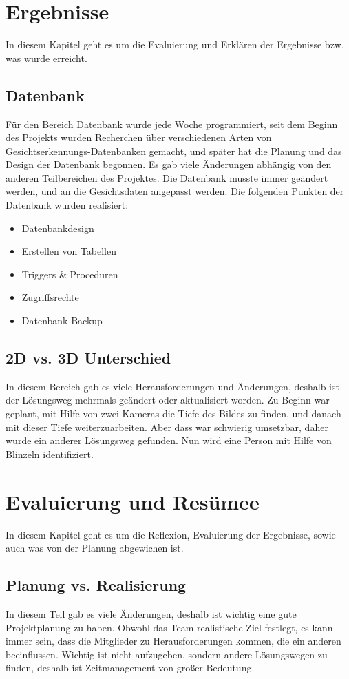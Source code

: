 \newpage
\section{Ergebnisse}
In diesem Kapitel geht es um die Evaluierung und Erklären der Ergebnisse bzw. was wurde erreicht.
\subsection{Datenbank}
Für den Bereich Datenbank wurde jede Woche programmiert, seit dem Beginn des Projekts wurden Recherchen über verschiedenen Arten von Gesichtserkennungs-Datenbanken gemacht, und später hat die Planung und das Design der Datenbank begonnen. Es gab viele Änderungen abhängig von den anderen Teilbereichen des Projektes. Die Datenbank musste immer geändert werden, und an die Gesichtsdaten angepasst werden. Die folgenden Punkten der Datenbank wurden realisiert:
\begin{itemize}
	\item Datenbankdesign
	\item Erstellen von Tabellen
	\item Triggers \& Proceduren
	\item Zugriffsrechte
	\item Datenbank Backup
\end{itemize}
\subsection{2D vs. 3D Unterschied}
In diesem Bereich gab es viele Herausforderungen und Änderungen, deshalb ist der Lösungsweg mehrmals geändert oder aktualisiert worden. Zu Beginn war geplant, mit Hilfe von zwei Kameras die Tiefe des Bildes zu finden, und danach mit dieser Tiefe weiterzuarbeiten. Aber dass war schwierig umsetzbar, daher wurde ein anderer Lösungsweg gefunden. Nun wird eine Person mit Hilfe von  Blinzeln identifiziert.
\section{Evaluierung und Resümee}
In diesem Kapitel geht es um die Reflexion, Evaluierung der Ergebnisse, sowie auch  was von der Planung abgewichen ist.
\subsection{Planung vs. Realisierung}
In diesem Teil gab es viele Änderungen, deshalb ist wichtig eine gute Projektplanung zu haben. Obwohl das Team realistische Ziel festlegt, es kann immer sein, dass die Mitglieder zu Herausforderungen kommen, die ein anderen beeinflussen. Wichtig ist nicht aufzugeben, sondern andere Lösungswegen zu finden, deshalb ist Zeitmanagement von großer Bedeutung.
